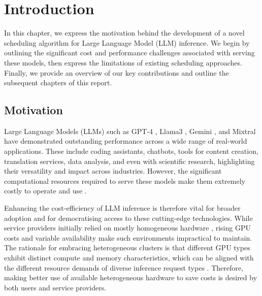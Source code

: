 \graphicspath{{chapters/01introduction/graphics}}

\chapter{Introduction}
\label{firstcontentpage} %
%
%

In this chapter, we express the motivation behind the development of a novel scheduling algorithm for Large Language Model (LLM) inference.
We begin by outlining the significant cost and performance challenges associated with serving these models, then express the limitations of existing scheduling approaches.
Finally, we provide an overview of our key contributions and outline the subsequent chapters of this report.

\section{Motivation}


Large Language Models (LLMs) such as GPT-4 \autocite{openaiGPT4TechnicalReport2024}, Llama3 \autocite{grattafioriLlama3Herd2024}, Gemini \autocite{teamGeminiFamilyHighly2025}, and Mixtral \autocite{jiangMixtralExperts2024} have demonstrated outstanding performance across a wide range of real-world applications.
These include coding assistants, chatbots, tools for content creation, translation services, data analysis, and even with scientific research, highlighting their versatility and impact across industries. %
However, the significant computational resources required to serve these models make them extremely costly to operate and use \autocite{luccioniPowerHungryProcessing2024}.

Enhancing the cost-efficiency of LLM inference is therefore vital for broader adoption and for democratising access to these cutting-edge technologies.
While service providers initially relied on mostly homogeneous hardware \autocite{zhaoLLMPQServingLLM2024}, rising GPU costs and variable availability \autocite{miaoSpotServeServingGenerative2023} make such environments impractical to maintain.
The rationale for embracing heterogeneous clusters is that different GPU types exhibit distinct compute and memory characteristics, which can be aligned with the different resource demands of diverse inference request types \autocite{jiangDemystifyingCostEfficiencyLLM2025}.
Therefore, making better use of available heterogeneous hardware to save costs is desired by both users and service providers.

